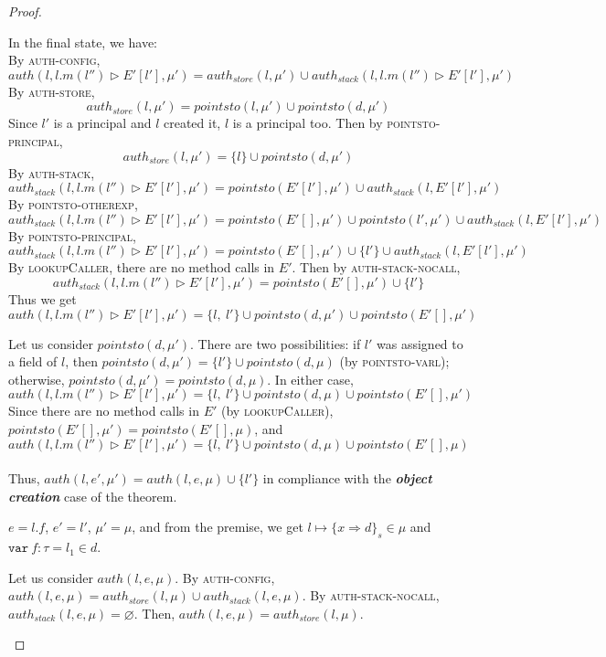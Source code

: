 \documentclass{llncs}
\newcommand{\keywadj}[1]{\mathtt{#1}}
\newcommand{\keyw}[1]{\keywadj{#1}~}
\newcommand{\pcase}[1][]{
  \if\relax\detokenize{#1}\relax
    \def\thiscase{}
  \else
    \def\thiscase{~#1}
  \fi
  \item
}
\begin{document}
\begin{proof}
\begin{pcases}
In the final state, we have:\\

By \textsc{auth-config},
\[
auth(l, l.m(l'') \rhd E'[l'], \mu') = auth_{store}(l, \mu') \cup auth_{stack}(l, l.m(l'') \rhd E'[l'], \mu')
\]
By \textsc{auth-store},
\[
auth_{store}(l, \mu') = pointsto(l, \mu') \cup pointsto(d, \mu')
\]
Since $l'$ is a principal and $l$ created it, $l$ is a principal too. Then by \textsc{pointsto-principal},
\[
auth_{store}(l, \mu') =  \{ l \} \cup pointsto(d, \mu')
\]
By \textsc{auth-stack},
\[
auth_{stack}(l, l.m(l'') \rhd E'[l'], \mu') = pointsto(E'[l'], \mu') \cup auth_{stack}(l, E'[l'], \mu')
\]
By \textsc{pointsto-otherexp},
\[
auth_{stack}(l, l.m(l'') \rhd E'[l'], \mu') = pointsto(E'[], \mu') \cup pointsto(l', \mu') \cup auth_{stack}(l, E'[l'], \mu')
\]
By \textsc{pointsto-principal},
\[
auth_{stack}(l, l.m(l'') \rhd E'[l'], \mu') = pointsto(E'[], \mu') \cup \{ l' \} \cup auth_{stack}(l, E'[l'], \mu')
\]
By \textsc{lookupCaller}, there are no method calls in $E'$. Then by \textsc{auth-stack-nocall},
\[
auth_{stack}(l, l.m(l'') \rhd E'[l'], \mu') = pointsto(E'[], \mu') \cup \{ l' \}
\]
Thus we get
\[
auth(l, l.m(l'') \rhd E'[l'], \mu') = \{ l,~l' \} \cup pointsto(d, \mu') \cup pointsto(E'[], \mu')
\]

Let us consider $pointsto(d, \mu')$. There are two possibilities: if $l'$ was assigned to a field of $l$, then $pointsto(d, \mu') = \{ l' \} \cup pointsto(d, \mu)$ (by \textsc{pointsto-varl}); otherwise, $pointsto(d, \mu') = pointsto(d, \mu)$. In either case,
\[
auth(l, l.m(l'') \rhd E'[l'], \mu') = \{ l,~l' \} \cup pointsto(d, \mu) \cup pointsto(E'[], \mu')
\]
Since there are no method calls in $E'$ (by \textsc{lookupCaller}), $pointsto(E'[], \mu') = pointsto(E'[], \mu)$, and
\[
auth(l, l.m(l'') \rhd E'[l'], \mu') = \{ l,~l' \} \cup pointsto(d, \mu) \cup pointsto(E'[], \mu)
\]\\

Thus, $auth(l, e', \mu') = auth(l, e, \mu) \cup \{ l' \}$ in compliance with the \textbf{\textit{object creation}} case of the theorem.
\\
\pcase[\textsc{E-Field}]
$e = l.f$, $e' = l'$, $\mu' = \mu$, and from the premise, we get $l \mapsto \{ x \Rightarrow d \}_{s} \in \mu$ and $\keyw{var} f:\tau = l_1 \in d$.

\hspace{12pt} Let us consider $auth(l, e, \mu)$. By \textsc{auth-config}, $auth(l, e, \mu) = auth_{store}(l, \mu) \cup auth_{stack}(l,e,\mu)$. By \textsc{auth-stack-nocall}, $auth_{stack}(l, e, \mu) = \varnothing$. Then, $auth(l, e, \mu) = auth_{store}(l, \mu)$.


\end{pcases}
\end{proof}
\end{document}
